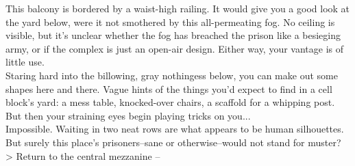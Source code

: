 This balcony is bordered by a waist-high railing. It would give you a good look at the yard below, were it not smothered by this all-permeating fog. No ceiling is visible, but it’s unclear whether the fog has breached the prison like a besieging army, or if the complex is just an open-air design. Either way, your vantage is of little use.\\

Staring hard into the billowing, gray nothingess below, you can make out some shapes here and there. Vague hints of the things you’d expect to find in a cell block’s yard: a mess table, knocked-over chairs, a scaffold for a whipping post. But then your straining eyes begin playing tricks on you...\\

Impossible. Waiting in two neat rows are what appears to be human silhouettes. But surely this place’s prisoners--sane or otherwise--would not stand for muster?\\

> Return to the central mezzanine -- 